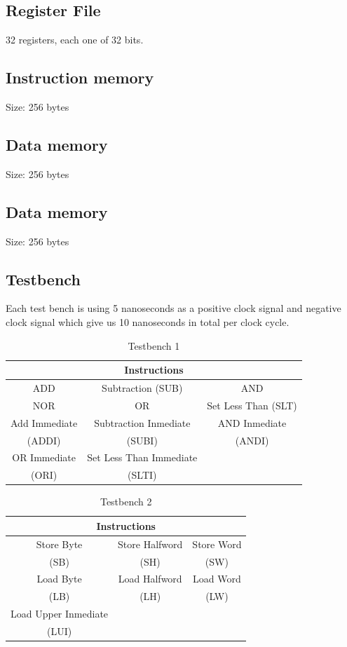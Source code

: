\documentclass[conference]{IEEEtran}
\begin{document}
\subsection{Register File}
32 registers, each one of 32 bits.
\subsection{Instruction memory}
Size: 256 bytes
\subsection{Data memory}
Size: 256 bytes\\
\subsection{Data memory}
Size: 256 bytes\\
\subsection{Testbench}
Each test bench is using 5 nanoseconds as a positive clock signal and negative clock signal which give us 10 nanoseconds in total per clock cycle.

\begin{table}[htbp]
\caption{Testbench 1} %
\begin{tabular}{|c|c|c|}
\hline
\multicolumn{3}{|c|}{\textbf{Instructions}} \\
\hline
ADD&Subtraction (SUB)&AND  \\
\hline
NOR&OR&Set Less Than (SLT) \\
\hline
Add Immediate&Subtraction Inmediate & AND Inmediate \\
(ADDI) &(SUBI) & (ANDI) \\
\hline
OR Immediate&Set Less Than Immediate&  \\
(ORI)&(SLTI)&  \\
\hline
\end{tabular}
\label{tab_test1}
\end{table}

\begin{table}[t]
\caption{Testbench 2} %
\begin{center}
\begin{tabular}{|c|c|c|}
\hline
\multicolumn{3}{|c|}{\textbf{Instructions}} \\
\hline
Store Byte&Store Halfword&Store Word\\
(SB)&(SH)&(SW)  \\
\hline
Load Byte&Load Halfword&Load Word\\
(LB)&(LH)&(LW) \\
\hline
Load Upper Inmediate&&\\
(LUI)&& \\
\hline
\end{tabular}
\label{tab_test2}
\end{center}
\end{table}
\end{document}
